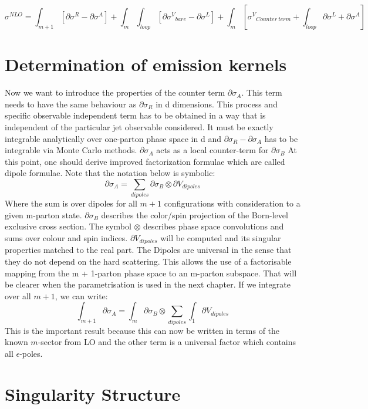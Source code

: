 \begin{equation}
\sigma^{NLO} = \int_{m+1} [\partial \sigma^R -\partial \sigma^A]+ \int_m \int_{loop}[ \partial {\sigma^V}_{bare}- \partial {\sigma^L}] + \int_m[{\sigma^V}_{Counter\:term}+ \int_{loop} \partial {\sigma^L}+\partial \sigma^A]
\end{equation}
\pagebreak
\section*{Determination of emission kernels}
Now we want to introduce the properties of the counter term $ \partial \sigma_A $. This term needs to have the same behaviour as $ \partial \sigma_R $ in d dimensions. This process and specific observable independent term has to be obtained in a way that is independent of the particular jet observable considered. It must be exactly integrable analytically over one-parton phase space in d and $ \partial \sigma_R -  \partial \sigma_A  $ has to be integrable via Monte Carlo methods. $ \partial \sigma_A $ acts as a local counter-term for $ \partial \sigma_B $
At this point, one should derive improved factorization formulae which are called dipole formulae. Note that the notation below is symbolic:
\begin{equation}
\partial \sigma_A = \sum_{dipoles} \partial \sigma_{B} \otimes \partial V_{dipoles}
\end{equation}
Where the sum is over dipoles for all $ m+1 $ configurations with consideration to a given m-parton state. $  \partial \sigma_{B}$ describes the color/spin
projection of the Born-level exclusive cross section.
The symbol $ \otimes $ describes phase space convolutions and sums over colour and spin indices. $ \partial V_{dipoles} $ will be computed and its singular properties matched to the real part. The Dipoles are universal in the sense that they do not depend on the hard scattering. This allows the use of a factorisable mapping from
the m + 1-parton phase space to an m-parton subspace. That will be clearer when the parametrisation is used in the next chapter. 
If we integrate over all $ m+1 $, we can write:
\begin{equation}
\int_{m+1}\partial \sigma_A =  \int_{m} \partial \sigma_{B} \otimes \sum_{dipoles} \int_{1}\partial V_{dipoles}
\end{equation}
This is the important result because this can now be written in terms of the known $ m $-sector from LO and the other term is a universal factor which contains all $ \epsilon $-poles.
\section*{Singularity Structure}

